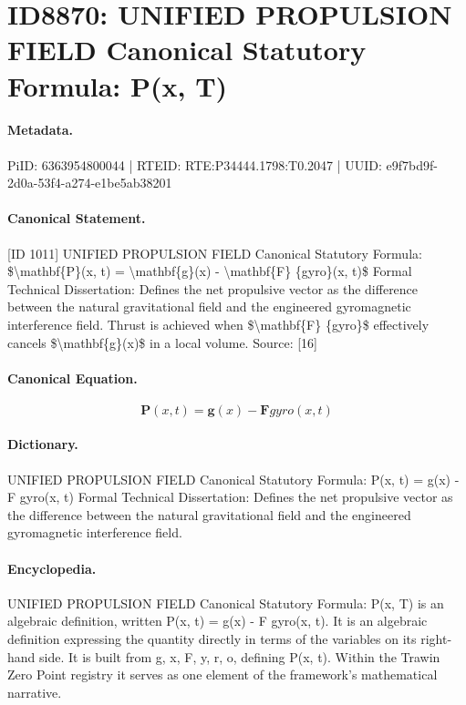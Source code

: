 \section*{ID8870: UNIFIED PROPULSION FIELD Canonical Statutory Formula: P(x, T)}
\paragraph{Metadata.}
PiID: 6363954800044 | RTEID: RTE:P34444.1798:T0.2047 | UUID: e9f7bd9f-2d0a-53f4-a274-e1be5ab38201

\paragraph{Canonical Statement.}
[ID 1011] UNIFIED PROPULSION FIELD Canonical Statutory Formula: \$\textbackslash{}mathbf\{P\}(x, t) = \textbackslash{}mathbf\{g\}(x) - \textbackslash{}mathbf\{F\} \{gyro\}(x, t)\$ Formal Technical Dissertation: Defines the net propulsive vector as the difference between the natural gravitational field and the engineered gyromagnetic interference field. Thrust is achieved when \$\textbackslash{}mathbf\{F\} \{gyro\}\$ effectively cancels \$\textbackslash{}mathbf\{g\}(x)\$ in a local volume. Source: [16]

\paragraph{Canonical Equation.}
\[
\mathbf{P}(x, t) = \mathbf{g}(x) - \mathbf{F} {gyro}(x, t)
\]

\paragraph{Dictionary.}
UNIFIED PROPULSION FIELD Canonical Statutory Formula: P(x, t) = g(x) - F gyro(x, t) Formal Technical Dissertation: Defines the net propulsive vector as the difference between the natural gravitational field and the engineered gyromagnetic interference field.

\paragraph{Encyclopedia.}
UNIFIED PROPULSION FIELD Canonical Statutory Formula: P(x, T) is an algebraic definition, written P(x, t) = g(x) - F gyro(x, t). It is an algebraic definition expressing the quantity directly in terms of the variables on its right-hand side. It is built from g, x, F, y, r, o, defining P(x, t). Within the Trawin Zero Point registry it serves as one element of the framework's mathematical narrative.
